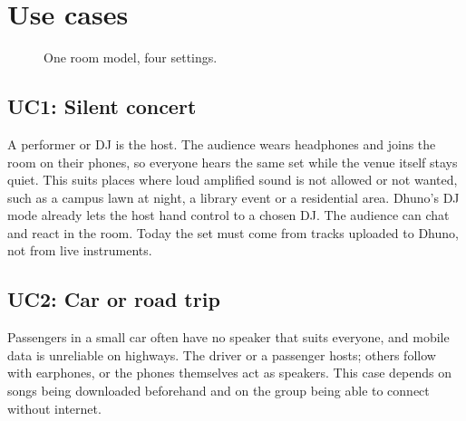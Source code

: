 \documentclass[11pt,a4paper]{article}
\begin{document}
\section{Use cases}\label{sec:usecases}
\begin{figure}[htbp]
\centering
{}
\caption{One room model, four settings.}
\label{fig:usecases}
\end{figure}

\subsection{UC1: Silent concert}
A performer or DJ is the host. The audience wears headphones and joins the room on their
phones, so everyone hears the same set while the venue itself stays quiet. This suits
places where loud amplified sound is not allowed or not wanted, such as a campus lawn at
night, a library event or a residential area. Dhuno's DJ mode already lets the host hand
control to a chosen DJ. The audience can chat and react in the room. Today the set must
come from tracks uploaded to Dhuno, not from live instruments.

\subsection{UC2: Car or road trip}
Passengers in a small car often have no speaker that suits everyone, and mobile data is
unreliable on highways. The driver or a passenger hosts; others follow with earphones, or
the phones themselves act as speakers. This case depends on songs being downloaded
beforehand and on the group being able to connect without internet.
\end{document}
